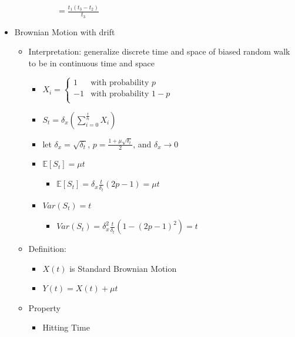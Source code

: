 \documentclass[a4paper]{article}
\begin{document}
\begin{itemize}
\begin{itemize}
\begin{itemize}
\begin{itemize}
                                $= \frac{t_1(t_3-t_2)}{t_3}$
                        \end{itemize}
                \end{itemize}
        \end{itemize}
    \item Brownian Motion with drift
        \begin{itemize}
            \item Interpretation: generalize discrete time and space of biased random walk to be in continuous time and space
                \begin{itemize}
                    \item $X_i = \left\{ \begin{array}{ll}
                                1 & \text{with probability } p \\ 
                                -1 & \text{with probability } 1-p \\ 
                            \end{array} \right.$
                    \item $S_t = \delta_x (\sum_{i=0}^{\frac{t}{\delta_t}} X_i)$
                    \item let $\delta_x = \sqrt{\delta_t}$, $p = \frac{1 + \mu \sqrt{\delta_t}}{2}$, and $\delta_x \rightarrow 0$
                    \item $\mathbb{E}[S_t] = \mu t$
                        \begin{itemize}
                            \item $\mathbb{E}[S_t] = \delta_x \frac{t}{\delta_t} (2p-1) = \mu t$
                        \end{itemize}
                    \item $\mathit{Var}(S_t) = t$
                        \begin{itemize}
                            \item $\mathit{Var}(S_t) = \delta_x^2 \frac{t}{\delta_t} (1-(2p-1)^2) = t$
                        \end{itemize}
                \end{itemize}
            \item Definition:
                \begin{itemize}
                    \item $X(t)$ is Standard Brownian Motion
                    \item $Y(t) = X(t) + \mu t$
                \end{itemize}
            \item Property
                \begin{itemize}
                    \item Hitting Time


\end{itemize}
\end{itemize}
\end{itemize}
\end{document}
